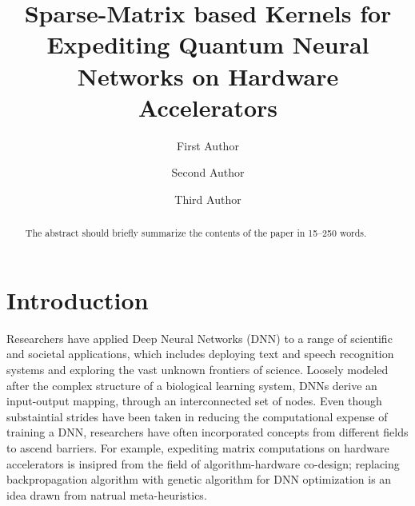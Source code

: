 \documentclass[runningheads]{llncs}
\begin{document}
%
\title{Sparse-Matrix based Kernels for Expediting Quantum Neural Networks on Hardware Accelerators}
%
%
\author{First Author \and
Second Author \and
Third Author}
%
%
%
\maketitle              %
%
\begin{abstract}
The abstract should briefly summarize the contents of the paper in
15--250 words.

\end{abstract}
%
%
%
\section{Introduction}

Researchers have applied Deep Neural Networks (DNN) \cite{Hinton} to a range of scientific and societal applications, which includes deploying text and speech recognition systems and exploring the vast unknown frontiers of science. Loosely modeled after the complex structure of a biological learning system, DNNs derive an input-output mapping, through an interconnected set of nodes. Even though substaintial strides have been taken in reducing the computational expense of training a DNN, researchers have often incorporated concepts from different fields to ascend barriers. For example, expediting matrix computations on hardware accelerators is insipred from the field of algorithm-hardware co-design; replacing backpropagation algorithm with genetic algorithm for DNN optimization is an idea drawn from natrual meta-heuristics. 
\end{document}
